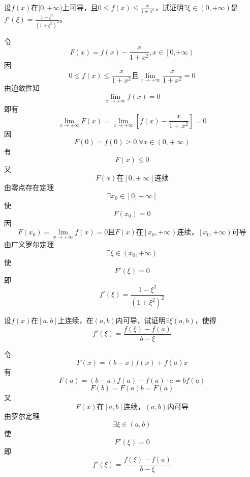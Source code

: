 \begin{example}
	设$f(x)$在$[0,+\infty)$上可导，且$0\leqslant f(x)\leqslant\frac{x}{1+x^2}$，试证明$\exists\xi\in(0,+\infty)$是$f'(\xi)=\frac{1-\xi^2}{(1+\xi^2)^2}$。
\end{example}
	\begin{newproof}
		令\[F\left( x \right) =f\left( x \right) -\frac{x}{1+x^2},x\in \left[ \text{0,}\left. +\infty \right) \right. \]
		因\[0\leqslant f\left( x \right) \leqslant \frac{x}{1+x^2}\text{且}\underset{x\rightarrow +\infty}{\lim}\frac{x}{1+x^2}=0\]
		由迫敛性知\[\underset{x\rightarrow +\infty}{\lim}f\left( x \right) =0\]
		即有\[\underset{x\rightarrow +\infty}{\lim}F\left( x \right) =\underset{x\rightarrow +\infty}{\lim}\left[ f\left( x \right) -\frac{x}{1+x^2} \right] =0\]
		因\[F\left( 0 \right) =f\left( 0 \right) \geqslant \text{0,}\forall x\in \left( \text{0,}+\infty \right) \]
		有\[F\left( x \right) \leqslant 0\]
		又\[F\left( x \right) \text{在}\left[ \text{0,}+\infty \right] \text{连续}\]
		由零点存在定理\[\exists x_0\in \left[ \text{0,}+\infty \right] \]
		使\[F\left( x_0 \right) =0\]
		因\[F\left( x_0 \right) =\lim_{x\rightarrow +\infty} f\left( x \right) =\text{0且}F\left( x \right) \text{在}\left[ x_0 \right. ,\left. +\infty \right) \text{连续，}\left[ x_0 \right. ,\left. +\infty \right) \text{可导}\]
		由广义罗尔定理\[\exists \xi \in \left( x_0,+\infty \right) \]
		使\[F'\left( \xi \right) =0\]
		即\[f'\left( \xi \right) =\frac{1-\xi ^2}{\left( 1+\xi ^2 \right) ^2}\]
	\end{newproof}

\begin{example}
	设$f(x)$在$[a,b]$上连续，在$(a,b)$内可导，试证明$\exists\xi(a,b)$，使得\[f'(\xi)=\frac{f(\xi)-f(a)}{b-\xi}\]
\end{example}
	\begin{newproof}
		令\[F\left( x \right) =\left( b-x \right) f\left( x \right) +f\left( a \right) x\]
		有\[F\left( a \right) =\left( b-a \right) f\left( a \right) +f\left( a \right) \cdot a=bf\left( a \right) \]
		\[F\left( b \right) =F\left( a \right) b=F\left( a \right) \]
		又\[F\left( x \right) \text{在}\left[ a,b \right] \text{连续，}\left( a,b \right) \text{内可导}\]
		由罗尔定理\[\exists \xi \in \left( a,b \right) \]
		使\[F'\left( \xi \right) =0\]
		即\[f'\left( \xi \right) =\frac{f\left( \xi \right) -f\left( a \right)}{b-\xi}\]
	\end{newproof}

